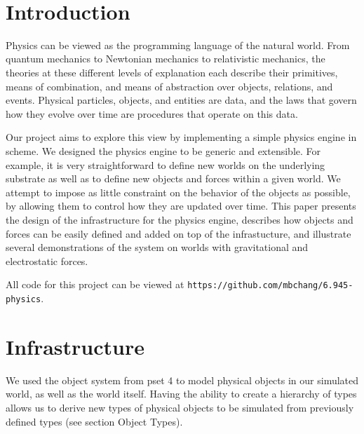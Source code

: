 \documentclass{article}
\title{
    \textbf{\hmwkTitle} \\
    \smallskip
    \normalsize{\hmwkSubtitle} \\
    \hmwkClass \\
    \normalsize{\hmwkClassInstructor} \\
}
\author{\hmwkAuthorName}
\date{}
\begin{document}
\maketitle
\section{Introduction}

Physics can be viewed as the programming language of the natural world. From
quantum mechanics to Newtonian mechanics to relativistic mechanics, the
theories at these different levels of explanation each describe their
primitives, means of combination, and means of abstraction over objects,
relations, and events. Physical particles, objects, and entities are data, and
the laws that govern how they evolve over time are procedures that operate on
this data.

Our project aims to explore this view by implementing a simple physics engine
in scheme. We designed the physics engine to be generic and extensible. For
example, it is very straightforward to define new worlds on the underlying
substrate as well as to define new objects and forces within a given world. We
attempt to impose as little constraint on the behavior of the objects as
possible, by allowing them to control how they are updated over time.  This
paper presents the design of the infrastructure for the physics engine,
describes how objects and forces can be easily defined and added on top of the
infrastucture, and illustrate several demonstrations of the system on worlds
with gravitational and electrostatic forces.

All code for this project can be viewed at
\texttt{https://github.com/mbchang/6.945-physics}.


\section{Infrastructure}

We used the object system from pset 4 to model physical objects in our
simulated world, as well as the world itself. Having the ability to create a
hierarchy of types allows us to derive new types of physical objects to be
simulated from previously defined types (see section Object Types).
\end{document}
